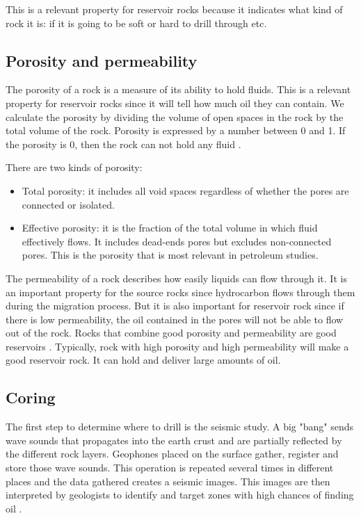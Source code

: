 This is a relevant property for reservoir rocks because it indicates what kind of rock it is: if it is going to be soft or hard to drill through etc.

\subsection{Porosity and permeability}

The porosity of a rock is a measure of its ability to hold fluids. This is a relevant property for reservoir rocks since it will tell how much oil they can contain. We calculate the porosity by dividing the volume of open spaces in the rock by the total volume of the rock. Porosity is expressed by a number between 0 and 1. If the porosity is 0, then the rock can not hold any fluid \cite{oilbegin}. 
 
There are two kinds of porosity:
\begin{itemize}
    \item Total porosity: it includes all void spaces regardless of whether the pores are connected or isolated.
    \item Effective porosity: it is the fraction of the total volume in which fluid effectively flows. It includes dead-ends pores but excludes non-connected pores. This is the porosity that is most relevant in petroleum studies. 
\end{itemize}

The permeability of a rock describes how easily liquids can flow through it. It is an important property for the source rocks since hydrocarbon flows through them during the migration process. But it is also important for reservoir rock since if there is low permeability, the oil contained in the pores will not be able to flow out of the rock. 
Rocks that  combine good porosity and permeability are good reservoirs . Typically, rock with high porosity and high permeability will make a good reservoir rock. It can hold and deliver large amounts of oil. 

\subsection{Coring}\label{sec:coring}
The first step to determine where to drill is the seismic study. A big "bang" sends wave sounds that propagates into the earth crust and are partially reflected by the different rock layers. Geophones placed on the surface gather, register and store those wave sounds. This operation is repeated several times in different places and the data gathered creates a seismic images. This images are then interpreted by geologists to identify and target zones with high chances of finding oil \cite{oilbegin}. 



